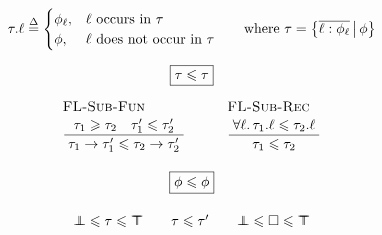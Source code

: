 $$ 
\begin{array}{c}
\flproj{\tau}{\ell} \defeq \begin{cases}
    \phi_\ell, & \ell \text{ occurs in } \tau \\
    \phi, & \ell \text{ does not occur in } \tau
\end{cases} \qquad \text{where } \tau = \flext{ \overline{\ell : \phi_\ell}}{\phi}
\\[1.5em]
\boxed{\tau \sub \tau}
\\[0.5em]
\irule{FL-Sub-Fun}{\tau_1 \super \tau_2 \quad \tau_1' \sub \tau_2'}{\tau_1 \to \tau_1' \sub \tau_2 \to \tau_2'}
\qquad
\irule{FL-Sub-Rec}{\forall \ell \ldotp \flproj{\tau_1}{\ell} \sub \flproj{\tau_2}{\ell}}{\tau_1 \sub \tau_2}
\\[2.5em]
\boxed{\phi \sub \phi}
\\[1em]
\flfbot \sub \tau \sub \flftop \qquad \tau \sub \tau' \qquad \flfbot \sub \flabsent \sub \flftop
\end{array} 
$$